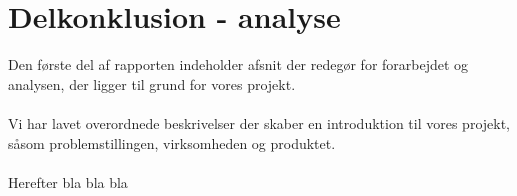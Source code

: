 \section{Delkonklusion - analyse}
Den første del af rapporten indeholder afsnit der redegør for forarbejdet og analysen, der ligger til grund for vores projekt.
\\\\
Vi har lavet overordnede beskrivelser der skaber en introduktion til vores projekt, såsom problemstillingen, virksomheden og produktet.
\\\\
Herefter bla bla bla 
